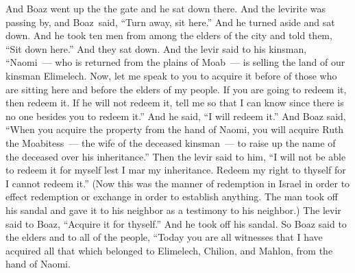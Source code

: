 
\begin{inparaenum}
     And Boaz went up the the gate and he sat down there. And the levirite was passing by, and Boaz\understood\ said, ``Turn away, sit here.'' And he turned aside and sat down.%
     And he took ten men from among the elders of the city and told them, ``Sit down here.'' And they sat down.%
     And the levir said to his kinsman, ``Naomi~--- who is returned from the plains of Moab~--- is selling the land of our kinsman Elimelech.%
     Now, let me speak to you to acquire it before of those who are sitting here and before the elders of my people. If you are going to redeem it, then redeem it. If he will not redeem it, tell me so that I can know since there is no one besides you to redeem it.'' And he said, ``I will redeem it.''%
     And Boaz said, ``When you acquire the property from the hand of Naomi, you will acquire Ruth the Moabitess~--- the wife of the deceased kinsman~--- to raise up the name of the deceased over his inheritance.''%
     Then the levir said to him, ``I will not be able to redeem it for myself lest I mar my inheritance. Redeem my right to thyself for I cannot redeem it.''%
     (Now this was the manner of redemption in Israel in order to effect redemption or exchange in order to establish anything. The man took off his sandal and gave it to his neighbor as a testimony to his neighbor.)%
     The levir said to Boaz, ``Acquire it for thyself.'' And he took off his sandal.%
     So Boaz said to the elders and to all of the people, ``Today you are all witnesses that I have acquired all that which belonged to Elimelech, Chilion, and Mahlon, from the hand of Naomi.%

\end{inparaenum}
